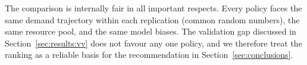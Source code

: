 The comparison is internally fair in all important respects.  Every
policy faces the same demand trajectory within each replication (common
random numbers), the same resource pool, and the same model biases.
The validation gap discussed in Section~\ref{sec:results:vv} does not
favour any one policy, and we therefore treat the ranking as a reliable
basis for the recommendation in Section~\ref{sec:conclusions}.
